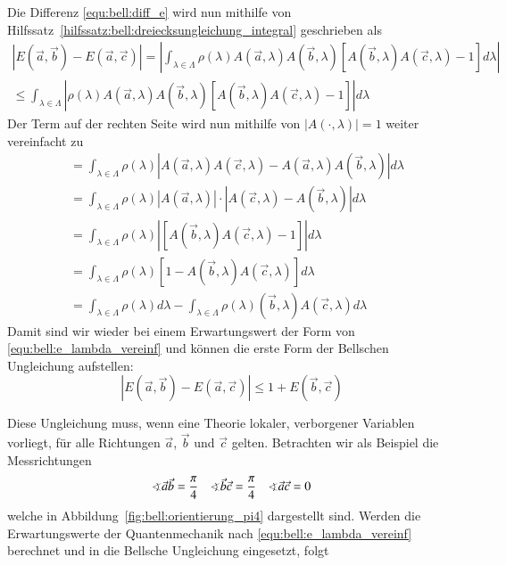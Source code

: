 \begin{refsection}
Die Differenz \eqref{equ:bell:diff_e} wird nun mithilfe von
Hilfssatz~\ref{hilfssatz:bell:dreiecksungleichung_integral} geschrieben als
\begin{equation}
\begin{split}
    |E(\vec{a},\vec{b}) - E(\vec{a},\vec{c})| =
    \left| \int_{\lambda\in\Lambda} \rho(\lambda)
        A(\vec{a},\lambda)A(\vec{b},\lambda)
        \left[ A(\vec{b},\lambda)A(\vec{c},\lambda) - 1 \right]
        d\lambda
    \right| \\
    \leq 
    \int_{\lambda\in\Lambda} \left|  
        \rho(\lambda)A(\vec{a},\lambda)A(\vec{b},\lambda)
        \left[ A(\vec{b},\lambda)A(\vec{c},\lambda) - 1 \right]
    \right| d\lambda
\end{split}
\end{equation}
Der Term auf der rechten Seite wird nun mithilfe von $|A(\cdot,\lambda)|=1$
weiter vereinfacht zu
\begin{align*}
    &= \int_{\lambda\in\Lambda} \rho(\lambda) \left|
    A(\vec{a},\lambda)A(\vec{c},\lambda) - A(\vec{a},\lambda)A(\vec{b},\lambda)
    \right| d\lambda \\
    &= \int_{\lambda\in\Lambda} \rho(\lambda)
    \left| A(\vec{a},\lambda) \right| \cdot 
    \left| A(\vec{c},\lambda) - A(\vec{b},\lambda) \right| d\lambda \\
    &= \int_{\lambda\in\Lambda} \rho(\lambda)
    \left|\left[ A(\vec{b},\lambda) A(\vec{c},\lambda) - 1 \right]\right| d\lambda \\
    &= \int_{\lambda\in\Lambda} \rho(\lambda) 
    \left[1 - A(\vec{b},\lambda)A(\vec{c},\lambda) \right] d\lambda \\
    &= \int_{\lambda\in\Lambda} \rho(\lambda) d\lambda
    - \int_{\lambda\in\Lambda} \rho(\lambda) 
    (\vec{b},\lambda)A(\vec{c},\lambda) d\lambda
\end{align*}
Damit sind wir wieder bei einem Erwartungswert der Form von
\eqref{equ:bell:e_lambda_vereinf} und k\"onnen die erste Form der Bellschen
Ungleichung \cite[(15)]{Bell:Bell1964} aufstellen:
\begin{equation}\label{equ:bell:bellsche_ungleichung}
    \left| E(\vec{a},\vec{b}) - E(\vec{a},\vec{c}) \right| 
    \leq
    1 + E(\vec{b},\vec{c})
\end{equation}

Diese Ungleichung muss, wenn eine Theorie lokaler, verborgener Variablen 
vorliegt, f\"ur alle Richtungen $\vec{a}$, $\vec{b}$ und $\vec{c}$ gelten.
Betrachten wir als Beispiel die Messrichtungen
\begin{align*}
    \varangle\vec{a}\vec{b} = \frac{\pi}{4} &&
    \varangle\vec{b}\vec{c} = \frac{\pi}{4} &&
    \varangle\vec{a}\vec{c} = 0
\end{align*}
welche in Abbildung~\ref{fig:bell:orientierung_pi4} dargestellt sind.
Werden die Erwartungswerte der Quantenmechanik nach 
\eqref{equ:bell:e_lambda_vereinf} berechnet und in die Bellsche Ungleichung
eingesetzt, folgt


\end{refsection}
